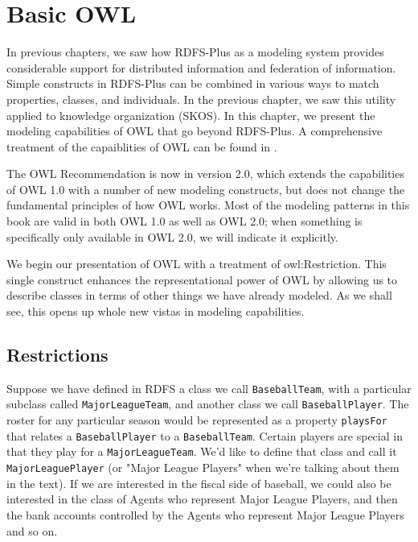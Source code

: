 \chapter{Basic OWL}
\label{ch12}

In previous chapters, we saw how RDFS-Plus as a modeling system provides
considerable support for distributed information and federation of
information. Simple constructs in RDFS-Plus can be combined in various
ways to match properties, classes, and individuals. In the previous
chapter, we saw this utility applied to knowledge organization (SKOS).
In this chapter, we present the modeling capabilities of OWL that go
beyond RDFS-Plus.  A comprehensive treatment of the capaiblities of OWL can be
found in \cite{doi:10.2200/S00824ED1V01Y201801WBE017}.

The OWL Recommendation is now in version 2.0, which extends the
capabilities of OWL 1.0 with a number of new modeling constructs, but
does not change the fundamental principles of how OWL works. Most of the
modeling patterns in this book are valid in both OWL 1.0 as well as OWL
2.0; when something is specifically only available in OWL 2.0, we will
indicate it explicitly.

We begin our presentation of OWL with a treatment of owl:Restriction.
This single
construct enhances the representational power of OWL by allowing us to
describe classes in terms of other things we have already modeled. As we
shall see, this opens up whole new vistas in modeling capabilities.

\section{Restrictions}

Suppose we have defined in RDFS a class we call \texttt{BaseballTeam}, with a
particular subclass called \texttt{MajorLeagueTeam}, and another class we call
\texttt{BaseballPlayer}. The roster for any particular season would be
represented as a property \texttt{playsFor} that relates a \texttt{BaseballPlayer} to a
\texttt{BaseballTeam}. Certain players are special in that they play for a
\texttt{MajorLeagueTeam}. We'd like to define that class and call it
\texttt{MajorLeaguePlayer} (or  "Major League Players"  when we're talking about them in the text). If we are interested in the fiscal side of baseball, we
could also be
interested in the class of Agents who represent Major League Players,
and then the bank accounts controlled by the Agents who represent Major
League Players and so on.

